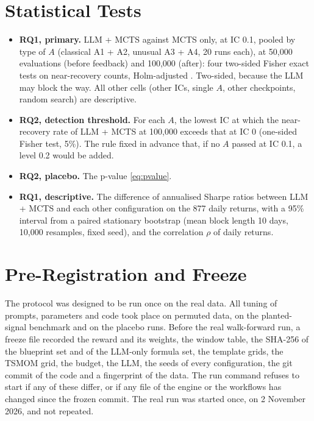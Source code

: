 \documentclass[12pt,a4paper,oneside]{book}
\theoremstyle{definition}
\newif\ifdsr
\begin{document}
\section{Statistical Tests}
\label{sec:tests}

\begin{itemize}
  \item \textbf{RQ1, primary.} LLM + MCTS against MCTS only, at IC 0.1, pooled by type of $A$ (classical A1 + A2, unusual A3 + A4, 20 runs each), at 50,000 evaluations (before feedback) and 100,000 (after): four two-sided Fisher exact tests on near-recovery counts, Holm-adjusted \cite{holm1979}. Two-sided, because the LLM may block the way. All other cells (other ICs, single $A$, other checkpoints, random search) are descriptive.
  \item \textbf{RQ2, detection threshold.} For each $A$, the lowest IC at which the near-recovery rate of LLM + MCTS at 100,000 exceeds that at IC 0 (one-sided Fisher test, 5\%). The rule fixed in advance that, if no $A$ passed at IC 0.1, a level 0.2 would be added.
  \item \textbf{RQ2, placebo.} The p-value \eqref{eq:pvalue}.
  \item \textbf{RQ1, descriptive.} The difference of annualised Sharpe ratios between LLM + MCTS and each other configuration on the 877 daily returns, with a 95\% interval from a paired stationary bootstrap \cite{politis1994} (mean block length 10 days, 10,000 resamples, fixed seed), and the correlation $\rho$ of daily returns.
\ifdsr
  \item \textbf{Supplementary.} The Deflated Sharpe Ratio \cite{bailey2014} of each real out-of-sample series (Section~\ref{sec:dsr}).
\fi
\end{itemize}

\section{Pre-Registration and Freeze}
\label{sec:freeze}

The protocol was designed to be run once on the real data. All tuning of prompts, parameters and code took place on permuted data, on the planted-signal benchmark and on the placebo runs. Before the real walk-forward run, a freeze file recorded the reward and its weights, the window table, the SHA-256 of the blueprint set and of the LLM-only formula set, the template grids, the TSMOM grid, the budget, the LLM, the seeds of every configuration, the git commit of the code and a fingerprint of the data. The run command refuses to start if any of these differ, or if any file of the engine or the workflows has changed since the frozen commit. The real run was started once, on 2 November 2026, and not repeated.
\end{document}
